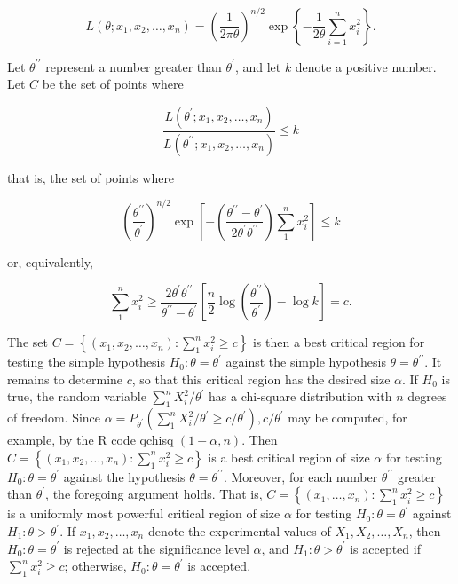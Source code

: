 $$
L\left(\theta ; x_{1}, x_{2}, \ldots, x_{n}\right)=\left(\frac{1}{2 \pi \theta}\right)^{n / 2} \exp \left\{-\frac{1}{2 \theta} \sum_{i=1}^{n} x_{i}^{2}\right\} .
$$

Let $\theta^{\prime \prime}$ represent a number greater than $\theta^{\prime}$, and let $k$ denote a positive number. Let $C$ be the set of points where

$$
\frac{L\left(\theta^{\prime} ; x_{1}, x_{2}, \ldots, x_{n}\right)}{L\left(\theta^{\prime \prime} ; x_{1}, x_{2}, \ldots, x_{n}\right)} \leq k
$$

that is, the set of points where

$$
\left(\frac{\theta^{\prime \prime}}{\theta^{\prime}}\right)^{n / 2} \exp \left[-\left(\frac{\theta^{\prime \prime}-\theta^{\prime}}{2 \theta^{\prime} \theta^{\prime \prime}}\right) \sum_{1}^{n} x_{i}^{2}\right] \leq k
$$

or, equivalently,

$$
\sum_{1}^{n} x_{i}^{2} \geq \frac{2 \theta^{\prime} \theta^{\prime \prime}}{\theta^{\prime \prime}-\theta^{\prime}}\left[\frac{n}{2} \log \left(\frac{\theta^{\prime \prime}}{\theta^{\prime}}\right)-\log k\right]=c .
$$

The set $C=\left\{\left(x_{1}, x_{2}, \ldots, x_{n}\right): \sum_{1}^{n} x_{i}^{2} \geq c\right\}$ is then a best critical region for testing the simple hypothesis $H_{0}: \theta=\theta^{\prime}$ against the simple hypothesis $\theta=\theta^{\prime \prime}$. It remains to determine $c$, so that this critical region has the desired size $\alpha$. If $H_{0}$ is true, the random variable $\sum_{1}^{n} X_{i}^{2} / \theta^{\prime}$ has a chi-square distribution with $n$ degrees of freedom. Since $\alpha=P_{\theta^{\prime}}\left(\sum_{1}^{n} X_{i}^{2} / \theta^{\prime} \geq c / \theta^{\prime}\right), c / \theta^{\prime}$ may be computed, for example, by the R code qchisq $(1-\alpha, n)$. Then $C=\left\{\left(x_{1}, x_{2}, \ldots, x_{n}\right): \sum_{1}^{n} x_{i}^{2} \geq c\right\}$ is a best critical region of size $\alpha$ for testing $H_{0}: \theta=\theta^{\prime}$ against the hypothesis $\theta=\theta^{\prime \prime}$. Moreover, for each number $\theta^{\prime \prime}$ greater than $\theta^{\prime}$, the foregoing argument holds. That is, $C=\left\{\left(x_{1}, \ldots, x_{n}\right): \sum_{1}^{n} x_{i}^{2} \geq c\right\}$ is a uniformly most powerful critical region of size $\alpha$ for testing $H_{0}: \theta=\theta^{\prime}$ against $H_{1}: \theta>\theta^{\prime}$. If $x_{1}, x_{2}, \ldots, x_{n}$ denote the experimental values of $X_{1}, X_{2}, \ldots, X_{n}$, then $H_{0}: \theta=\theta^{\prime}$ is rejected at the significance level $\alpha$, and $H_{1}: \theta>\theta^{\prime}$ is accepted if $\sum_{1}^{n} x_{i}^{2} \geq c$; otherwise, $H_{0}: \theta=\theta^{\prime}$ is accepted.

